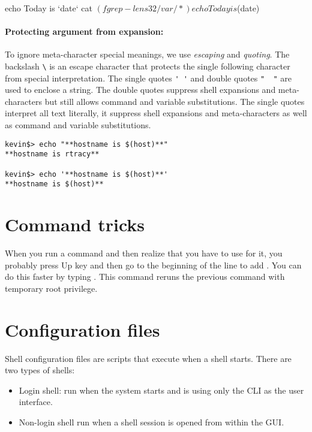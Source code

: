 \begin{commandshell}
echo Today is `date`
cat $(fgrep -l ens32 /var/*)
echo Today is $(date)
\end{commandshell}

\paragraph{Protecting argument from expansion:} To ignore meta-character special meanings, we use \emph{escaping} and \emph{quoting}. The backslash \verb|\| is an escape character that protects the single following character from special interpretation. The single quotes \verb|' '| and double quotes \verb|"  "| are used to enclose a string. The double quotes suppress shell expansions and meta-characters but still allows command and variable substitutions. The single quotes interpret all text literally, it suppress shell expansions and meta-characters as well as command and variable substitutions. 

\begin{verbatim}
kevin$> echo "**hostname is $(host)**"
**hostname is rtracy**

kevin$> echo '**hostname is $(host)**'
**hostname is $(host)**
\end{verbatim}

\section{Command tricks}

When you run a command and then realize that you have to use  for it, you probably press Up key and then go to the beginning of the line to add . You can do this faster by typing . This command reruns the previous command with temporary root privilege.\\



\section{Configuration files}

Shell configuration files are scripts that execute when a shell starts. There are two types of shells:

\begin{itemize}
\item Login shell: run when the system starts and is using only the CLI as the user interface.
\item Non-login shell run when a shell session is opened from within the GUI. 
\end{itemize}


